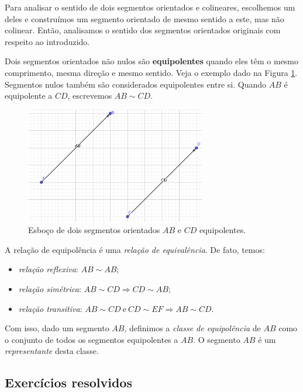 Para analisar o sentido de dois segmentos orientados e colineares, escolhemos um deles e construímos um segmento orientado de mesmo sentido a este, mas não colinear. Então, analisamos o sentido dos segmentos orientados originais com respeito ao introduzido.

Dois segmentos orientados não nulos são {\bf equipolentes} quando eles têm o mesmo comprimento, mesma direção e mesmo sentido. Veja o exemplo dado na Figura \ref{fig:segequipolentes}. Segmentos nulos também são considerados equipolentes entre si. Quando $AB$ é equipolente a $CD$, escrevemos $AB \sim CD$.

\begin{figure}[h!]
  \centering
  \includegraphics[width=0.7\textwidth]{./cap_vetor/dados/fig_segequipolentes/fig_segequipolentes}
  \caption{Esboço de dois segmentos orientados $AB$ e $CD$ equipolentes.}
  \label{fig:segequipolentes}
\end{figure}

A relação de equipolência é uma \emph{relação de equivalência}. De fato, temos:
\begin{itemize}
\item \emph{relação reflexiva}: $AB \sim AB$;
\item \emph{relação simétrica}: $AB \sim CD \Rightarrow CD \sim AB$;
\item \emph{relação transitiva}: $AB \sim CD ~ \text{e} ~ CD \sim EF \Rightarrow AB \sim CD$.
\end{itemize}

Com isso, dado um segmento $AB$, definimos a \emph{classe de equipolência} de $AB$ como o conjunto de todos os segmentos equipolentes a $AB$. O segmento $AB$ é um \emph{representante} desta classe.

\subsection*{Exercícios resolvidos}

